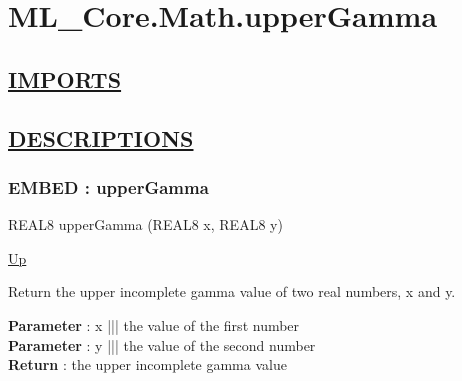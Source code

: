 \chapter*{ML\_Core.Math.upperGamma}
\hypertarget{ecldoc:toc:ML_Core.Math.upperGamma}{}

\section*{\underline{IMPORTS}}

\section*{\underline{DESCRIPTIONS}}
\subsection*{EMBED : upperGamma}
\hypertarget{ecldoc:ml_core.math.uppergamma}{}
\begin{minipage}[t]{\textwidth}
\begin{flushleft}
REAL8 upperGamma (REAL8 x, REAL8 y)
\end{flushleft}
\end{minipage}
\hyperlink{ecldoc:toc:ML_Core/Math}{Up}

\par
Return the upper incomplete gamma value of two real numbers, x and y.
\par
\textbf{Parameter} : x ||| the value of the first number \\
\textbf{Parameter} : y ||| the value of the second number \\
\textbf{Return} : the upper incomplete gamma value \\
